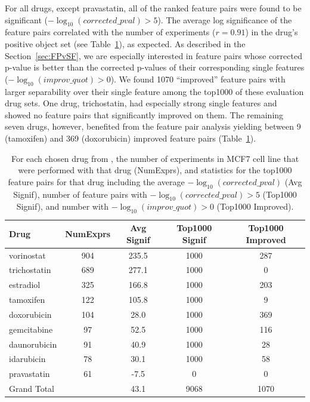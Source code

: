 For all drugs, except pravastatin, all of the \topthousand ranked feature pairs were found to be significant ($-\log_{10} (corrected\_pval) > 5$). The average log significance of the \topthousand feature pairs correlated with the number of experiments ($r=0.91$) in the drug's positive object set (see Table~\ref{tbl:selected_fps}), as expected. As described in the Section~\ref{sec:FPvSF}, we are especially interested in feature pairs whose corrected p-value is better than the corrected p-values of their corresponding single features ($-\log_{10} (improv\_quot) > 0$). We found 1070 ``improved'' feature pairs with larger separability over their single feature among the top1000 of these evaluation drug sets. One drug, trichostatin, had especially strong single features and showed no feature pairs that significantly improved on them. The remaining seven drugs, however, benefited from the feature pair analysis yielding between 9 (tamoxifen) and 369 (doxorubicin) improved feature pairs (Table~\ref{tbl:selected_fps}).

\begin{table}[t!]
\centering
\small
\begin{tabular}{|l|c|c|c|c|}
\hline
 Drug & NumExprs & Avg Signif & Top1000 Signif & Top1000 Improved\\
\hline
vorinostat & 904 & 235.5 & 1000 & 287\\
\hline
trichostatin & 689 & 277.1 & 1000 & 0\\
\hline
estradiol & 325 & 166.8 & 1000 & 203\\
\hline
tamoxifen & 122 & 105.8 & 1000 & 9\\
\hline
doxorubicin & 104 & 28.0 & 1000 & 369\\
\hline
gemcitabine & 97 & 52.5 & 1000 & 116\\
\hline
daunorubicin & 91 & 40.9 & 1000 & 28\\
\hline
idarubicin & 78 & 30.1 & 1000 & 58\\
\hline
pravastatin & 61 & -7.5 & 0 & 0\\
\hline
Grand Total & & 43.1 & 9068 & 1070\\
\hline
 \end{tabular}
\caption{For each chosen drug from \lincs, the number of experiments in MCF7 cell line that were performed with that drug (NumExprs), and statistics for the top1000 feature pairs for that drug including the average $-\log_{10} (corrected\_pval)$ (Avg Signif), number of feature pairs with $-\log_{10} (corrected\_pval) > 5$ (Top1000 Signif), and number with $-\log_{10} (improv\_quot) > 0$ (Top1000 Improved).}
\label{tbl:selected_fps}
\vspace{-18pt}
\end{table}



